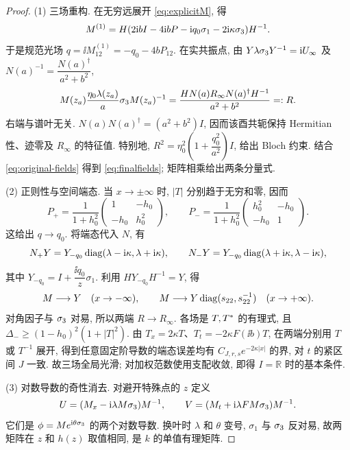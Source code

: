 \begin{proof}
(1) 三场重构. 在无穷远展开 \eqref{eq:explicitM}, 得
\begin{equation*}
M^{(1)}=H(2\mathrm{i} bI-4\mathrm{i} bP-\mathrm{i} q_0\sigma_1-2\mathrm{i}\kappa\sigma_3)H^{-1}.
\end{equation*}
于是规范光场 $q=\ii M^{(1)}_{12}=-q_0-4bP_{12}$. 在实共振点, 由 $Y\lambda\sigma_3 Y^{-1}=\mathrm{i} U_\infty$ 及 $N(a)^{-1}=\dfrac{N(a)^\dagger}{a^2+b^2}$,
\begin{equation}\label{eq:direct-medium}
M(z_a)\dfrac{\eta_0\lambda(z_a)}{a}\sigma_3 M(z_a)^{-1}
=\dfrac{HN(a)R_\infty N(a)^\dagger H^{-1}}{a^2+b^2}=:R.
\end{equation}
右端与谱叶无关. $N(a)N(a)^\dagger=(a^2+b^2)I$, 因而该酉共轭保持 Hermitian 性、迹零及 $R_\infty$ 的特征值. 特别地,
$R^2=\eta_0^2\left(1+\dfrac{q_0^2}{a^2}\right)I$, 给出 Bloch 约束. 结合 \eqref{eq:original-fields} 得到 \eqref{eq:finalfields}; 矩阵相乘给出两条分量式.

(2) 正则性与空间端态. 当 $x\to\pm\infty$ 时, $|T|$ 分别趋于无穷和零, 因而
\begin{equation}\label{eq:Pends}
P_+=\dfrac{1}{1+h_0^2}\begin{pmatrix}1&-h_0\\-h_0&h_0^2\end{pmatrix},\qquad
P_-=\dfrac{1}{1+h_0^2}\begin{pmatrix}h_0^2&-h_0\\-h_0&1\end{pmatrix}.
\end{equation}
这给出 $q\to q_0$. 将端态代入 $N$, 有
\begin{equation*}
N_+Y=Y_{-q_0}\operatorname{diag}(\lambda-\mathrm{i}\kappa,\lambda+\mathrm{i}\kappa),\qquad
N_-Y=Y_{-q_0}\operatorname{diag}(\lambda+\mathrm{i}\kappa,\lambda-\mathrm{i}\kappa),
\end{equation*}
其中 $Y_{-q_0}=I+\dfrac{\ii q_0}{z}\sigma_1$. 利用 $HY_{-q_0}H^{-1}=Y$, 得
\begin{equation}\label{eq:direct-M-ends}
M\longrightarrow Y\quad(x\to-\infty),\qquad
M\longrightarrow Y\operatorname{diag}(s_{22},s_{22}^{-1})\quad(x\to+\infty).
\end{equation}
对角因子与 $\sigma_3$ 对易, 所以两端 $R\to R_\infty$.
各场是 $T,{T}^{*}$ 的有理式, 且 $\Delta_-\ge(1-h_0)^2(1+|T|^2)$.
由 $T_x=2\kappa T$、$T_t=-2\kappa F(\ii b)T$, 在两端分别用 $T$ 或 $T^{-1}$ 展开,
得到任意固定阶导数的端态误差均有 $C_{J,r,s}e^{-2\kappa|x|}$ 的界, 对 $t$ 的紧区间 $J$ 一致.
故三场全局光滑; 对加权范数使用支配收敛, 即得 $I=\mathbb R$ 时的基本条件.

(3) 对数导数的奇性消去. 对避开特殊点的 $z$ 定义
\begin{equation}\label{eq:inverse-log-lax}
U=(M_x-\mathrm{i}\lambda M\sigma_3)M^{-1},\qquad
V=(M_t+\mathrm{i}\lambda F M\sigma_3)M^{-1}.
\end{equation}
它们是 $\phi=Me^{\mathrm{i}\theta\sigma_3}$ 的两个对数导数. 换叶时 $\lambda$ 和 $\theta$ 变号, $\sigma_1$ 与 $\sigma_3$ 反对易, 故两矩阵在 $z$ 和 $h(z)$ 取值相同, 是 $k$ 的单值有理矩阵.


\end{proof}
